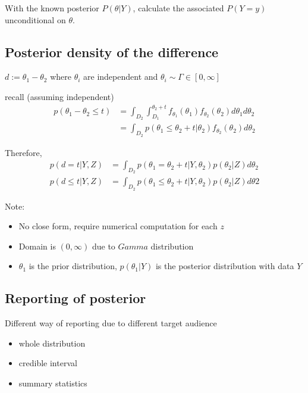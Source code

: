    With the known posterior $P(\theta|Y)$,
    calculate the associated $P(Y=y)$ unconditional on
    $\theta$.

    \subsection{Posterior density of the difference}
    $d := \theta_1 - \theta_2$ where $\theta_i$ are
    independent and $\theta_i \sim \Gamma \in[0, \infty]$

    recall (assuming independent)
    \begin{align*}
        p(\theta_1 - \theta_2 \leq t) &= \int_{D_2}
        \int_{D_1}^{\theta_2 + t} f_{\theta_1}(\theta_1) f_{\theta_2}
        (\theta_2) d\theta_1 d\theta_2\\
                                      &= \int_{D_2}
                                      p(\theta_1 \leq
                                      \theta_2 + t |
                                      \theta_2)
                                      f_{\theta_2}(\theta_2)d\theta_2
    \end{align*}

    Therefore,
    \begin{align*}
        p(d = t|Y, Z) &= \int_{D_2}
        p(\theta_1 = \theta_2+t|Y, \theta_2)p(\theta_2|Z)d\theta_2\\
        p(d \leq t |Y, Z) &= \int_{D_2} p(\theta_1 \leq \theta_2
        + t |Y, \theta_2) p(\theta_2|Z) d\theta2
    \end{align*}

    Note:
    \begin{itemize}
        \item No close form, require numerical computation for each $z$
        \item Domain is $(0, \infty)$ due to $Gamma$ distribution
        \item $\theta_1$ is the prior distribution,
            $p(\theta_1|Y)$ is the posterior distribution with data $Y$
    \end{itemize}


    \subsection{Reporting of posterior}
    Different way of reporting due to different target
    audience

    \begin{itemize}
        \item whole distribution
        \item credible interval
        \item summary statistics
    \end{itemize}

